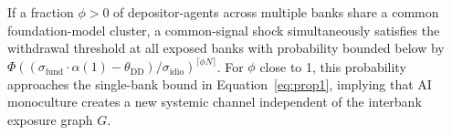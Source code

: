 \begin{corollary}
\label{cor:network}
If a fraction $\phi > 0$ of depositor-agents across multiple banks share a common foundation-model cluster, a common-signal shock simultaneously satisfies the withdrawal threshold at all exposed banks with probability bounded below by $\Phi((\sigma_{\text{fund}} \cdot \alpha(1) - \theta_{\text{DD}}) / \sigma_{\text{idio}})^{\lceil \phi N \rceil}$. For $\phi$ close to 1, this probability approaches the single-bank bound in Equation~\eqref{eq:prop1}, implying that AI monoculture creates a new systemic channel independent of the interbank exposure graph $G$.
\end{corollary}

